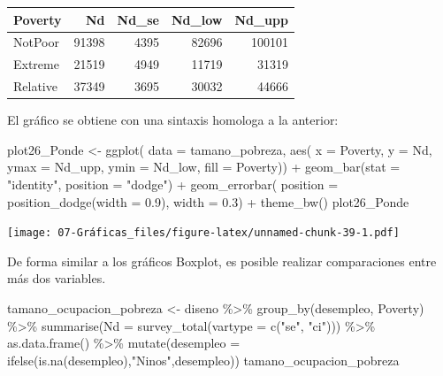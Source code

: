 \documentclass[
  12pt,
]{book}
\newenvironment{Shaded}{\begin{snugshade}}{\end{snugshade}}
\newcommand{\AttributeTok}[1]{\textcolor[rgb]{0.77,0.63,0.00}{#1}}
\newcommand{\FloatTok}[1]{\textcolor[rgb]{0.00,0.00,0.81}{#1}}
\newcommand{\FunctionTok}[1]{\textcolor[rgb]{0.00,0.00,0.00}{#1}}
\newcommand{\NormalTok}[1]{#1}
\newcommand{\OtherTok}[1]{\textcolor[rgb]{0.56,0.35,0.01}{#1}}
\newcommand{\SpecialCharTok}[1]{\textcolor[rgb]{0.00,0.00,0.00}{#1}}
\newcommand{\StringTok}[1]{\textcolor[rgb]{0.31,0.60,0.02}{#1}}
\begin{document}
\begin{tabular}{l|r|r|r|r}
\hline
Poverty & Nd & Nd\_se & Nd\_low & Nd\_upp\\
\hline
NotPoor & 91398 & 4395 & 82696 & 100101\\
\hline
Extreme & 21519 & 4949 & 11719 & 31319\\
\hline
Relative & 37349 & 3695 & 30032 & 44666\\
\hline
\end{tabular}

El gráfico se obtiene con una sintaxis homologa a la anterior:

\begin{Shaded}
\begin{Highlighting}[]
\NormalTok{plot26\_Ponde }\OtherTok{\textless{}{-}} \FunctionTok{ggplot}\NormalTok{(}
  \AttributeTok{data =}\NormalTok{ tamano\_pobreza,}
  \FunctionTok{aes}\NormalTok{(}
    \AttributeTok{x =}\NormalTok{ Poverty,}
    \AttributeTok{y =}\NormalTok{ Nd,}
    \AttributeTok{ymax =}\NormalTok{ Nd\_upp,}
    \AttributeTok{ymin =}\NormalTok{ Nd\_low,}
    \AttributeTok{fill =}\NormalTok{ Poverty)) }\SpecialCharTok{+}
  \FunctionTok{geom\_bar}\NormalTok{(}\AttributeTok{stat =} \StringTok{"identity"}\NormalTok{, }\AttributeTok{position =} \StringTok{"dodge"}\NormalTok{) }\SpecialCharTok{+}
  \FunctionTok{geom\_errorbar}\NormalTok{(}
    \AttributeTok{position =} \FunctionTok{position\_dodge}\NormalTok{(}\AttributeTok{width =} \FloatTok{0.9}\NormalTok{),}
    \AttributeTok{width =} \FloatTok{0.3}\NormalTok{) }\SpecialCharTok{+}
  \FunctionTok{theme\_bw}\NormalTok{()}
\NormalTok{plot26\_Ponde}
\end{Highlighting}
\end{Shaded}

\texttt{[image: 07-Gráficas\_files/figure-latex/unnamed-chunk-39-1.pdf]}

De forma similar a los gráficos Boxplot, es posible realizar comparaciones entre más dos variables.

\begin{Shaded}
\begin{Highlighting}[]
\NormalTok{tamano\_ocupacion\_pobreza }\OtherTok{\textless{}{-}}\NormalTok{ diseno }\SpecialCharTok{\%\textgreater{}\%}
  \FunctionTok{group\_by}\NormalTok{(desempleo, Poverty) }\SpecialCharTok{\%\textgreater{}\%}
  \FunctionTok{summarise}\NormalTok{(}\AttributeTok{Nd =} \FunctionTok{survey\_total}\NormalTok{(}\AttributeTok{vartype =} \FunctionTok{c}\NormalTok{(}\StringTok{"se"}\NormalTok{, }\StringTok{"ci"}\NormalTok{))) }\SpecialCharTok{\%\textgreater{}\%} \FunctionTok{as.data.frame}\NormalTok{() }\SpecialCharTok{\%\textgreater{}\%} 
  \FunctionTok{mutate}\NormalTok{(}\AttributeTok{desempleo =} \FunctionTok{ifelse}\NormalTok{(}\FunctionTok{is.na}\NormalTok{(desempleo),}\StringTok{"Ninos"}\NormalTok{,desempleo))}
\NormalTok{tamano\_ocupacion\_pobreza}
\end{Highlighting}
\end{Shaded}
\end{document}
